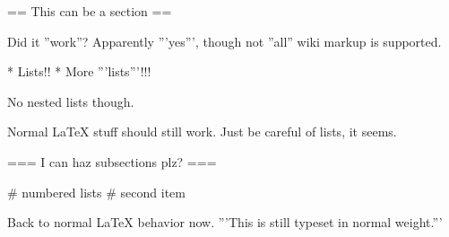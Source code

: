 \documentclass{article}
\begin{document}
\wikimarkup

== This can be a section ==

Did it ''work''? Apparently '''yes''', though not ''all'' wiki markup is supported.

* Lists!!
* More '''lists'''!!!

No nested lists though.

Normal \LaTeX{} stuff should still work. Just be careful of lists, it seems.

=== I can haz subsections plz? ===

# numbered lists
# second item

\nowikimarkup

Back to normal \LaTeX{} behavior now. '''This is still typeset in normal weight.'''
\end{document}
